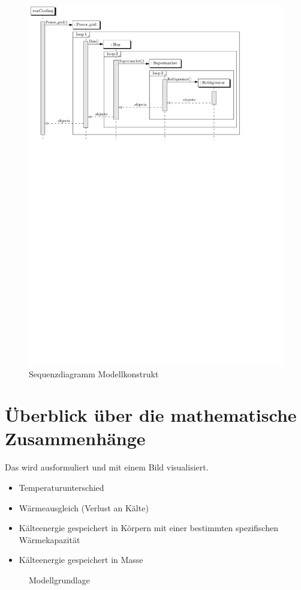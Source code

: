 \begin{figure}[h]
\caption{Sequenzdiagramm Modellkonstrukt}
	\label{uml_sequence}
	\begin{center}
	\includegraphics[scale=0.8]{images/Theorie_Super/sequence_one}
	\end{center}
\end{figure}
%

\section{Überblick über die mathematische Zusammenhänge}

Das wird ausformuliert und mit einem Bild visualisiert.
\begin{itemize}
	\item Temperaturunterschied
	\item Wärmeausgleich (Verlust an Kälte)
	\item Kälteenergie gespeichert in Körpern mit einer bestimmten spezifischen Wärmekapazität
	\item Kälteenergie gespeichert in Masse
\end{itemize}
\begin{figure}\caption{ Modellgrundlage}
\end{figure}


